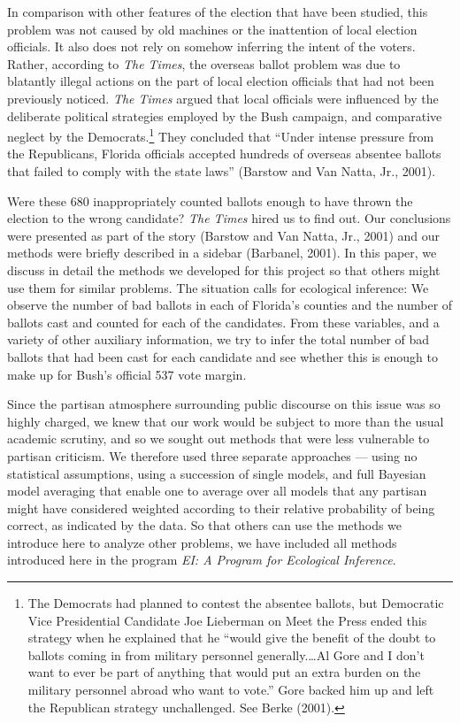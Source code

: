 \documentclass[11pt,titlepage]{article}
\begin{document}
In comparison with other features of the election that have been
studied, this problem was not caused by old machines or the
inattention of local election officials.  It also does not rely on
somehow inferring the intent of the voters.  Rather, according to
\emph{The Times}, the overseas ballot problem was due to blatantly
illegal actions on the part of local election officials that had not
been previously noticed.  \emph{The Times} argued that local officials
were influenced by the deliberate political strategies employed by the
Bush campaign, and comparative neglect by the Democrats.\footnote{The
  Democrats had planned to contest the absentee ballots, but
  Democratic Vice Presidential Candidate Joe Lieberman on Meet the
  Press ended this strategy when he explained that he ``would give the
  benefit of the doubt to ballots coming in from military personnel
  generally.\ldots Al Gore and I don't want to ever be part of
  anything that would put an extra burden on the military personnel
  abroad who want to vote.''  Gore backed him up and left the
  Republican strategy unchallenged.  See Berke (2001).}  They
concluded that ``Under intense pressure from the Republicans, Florida
officials accepted hundreds of overseas absentee ballots that failed
to comply with the state laws'' (Barstow and Van Natta, Jr.,
2001)\nocite{BarVan01}.

Were these 680 inappropriately counted ballots enough to have thrown
the election to the wrong candidate?  \emph{The Times} hired us to
find out.  Our conclusions were presented as part of the story
(Barstow and Van Natta, Jr., 2001) and our methods were briefly
described in a sidebar (Barbanel, 2001)\nocite{Barbanel01}.  In this
paper, we discuss in detail the methods we developed for this project
so that others might use them for similar problems.  The situation
calls for ecological inference: We observe the number of bad ballots
in each of Florida's counties and the number of ballots cast and
counted for each of the candidates.  From these variables, and a
variety of other auxiliary information, we try to infer the total
number of bad ballots that had been cast for each candidate and see
whether this is enough to make up for Bush's official 537 vote margin.

Since the partisan atmosphere surrounding public discourse on this
issue was so highly charged, we knew that our work would be subject to
more than the usual academic scrutiny, and so we sought out methods
that were less vulnerable to partisan criticism.  We therefore used
three separate approaches --- using no statistical assumptions, using
a succession of single models, and full Bayesian model averaging that
enable one to average over all models that any partisan might have
considered weighted according to their relative probability of being
correct, as indicated by the data.  So that others can use the methods
we introduce here to analyze other problems, we have included all
methods introduced here in the program \emph{EI: A Program for
  Ecological Inference}.
\end{document}
